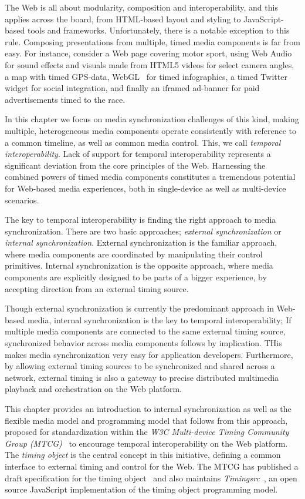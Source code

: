 The Web is all about modularity, composition and interoperability, and this
applies across the board, from HTML-based layout and styling to JavaScript-
based  tools and frameworks. Unfortunately, there is a notable exception to
this rule. Composing presentations from multiple, timed media components is
far from easy. For instance, consider a Web page covering motor sport, using
Web Audio~\cite{webaudio} for sound effects and visuals made from HTML5 videos
for select camera angles, a map with timed GPS-data, WebGL~\cite{webgl} for
timed infographics, a timed Twitter~\cite{twitter} widget for social
integration, and finally an iframed ad-banner for paid advertisements timed to
the race.

In this chapter we focus on media synchronization challenges of this kind,
making multiple, heterogeneous media components operate consistently with
reference to a common timeline, as well as common media control. This, we call
\emph{temporal interoperability}. Lack of support for temporal
interoperability represents a significant deviation from the core principles
of the Web. Harnessing the combined powers of timed media components
constitutes a tremendous potential for Web-based media experiences, both in
single-device as well as multi-device scenarios.

The key to temporal interoperability is finding the right approach to media
synchronization. There are two basic approaches; \emph{external
synchronization} or \emph{internal synchronization}. External synchronization
is the familiar approach, where media components are coordinated by
manipulating their control primitives. Internal synchronization is the
opposite approach, where media components are explicitly designed to be parts
of a bigger experience, by accepting direction from an external timing source.

Though external synchronization is currently the predominant approach in Web-
based media, internal synchronization is the key to temporal interoperability;
If multiple media components are connected to the same external timing source,
synchronized behavior across media components follows by implication. THis
makes media synchronization very easy for application developers. Furthermore,
by allowing external timing sources to be synchronized and shared across a
network, external timing is also a gateway to precise distributed multimedia
playback and orchestration on the Web platform.

This chapter provides an introduction to internal synchronization as well as
the flexible media model and programming model that follows from this
approach, proposed for standardization within the \emph{W3C Multi-device
Timing Community Group (MTCG)}~\cite{mtcg} to encourage temporal
interoperability on the Web platform. The \emph{timing object} is the central
concept in this initiative, defining a common interface to external timing and
control for the Web. The MTCG has published a draft specification for the
timing object~\cite{timingobject} and also maintains
\emph{Timingsrc}~\cite{timingsrc}, an open source JavaScript implementation of
the timing object programming model.

